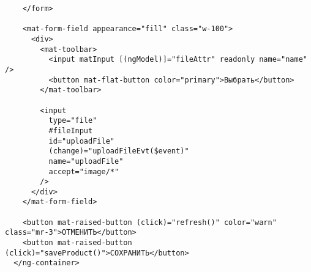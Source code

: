 \begin{lstlisting}
    </form>
    
    <mat-form-field appearance="fill" class="w-100">
      <div>
        <mat-toolbar>
          <input matInput [(ngModel)]="fileAttr" readonly name="name" />
          <button mat-flat-button color="primary">Выбрать</button>
        </mat-toolbar>
    
        <input
          type="file"
          #fileInput
          id="uploadFile"
          (change)="uploadFileEvt($event)"
          name="uploadFile"
          accept="image/*"
        />
      </div>
    </mat-form-field>
    
    <button mat-raised-button (click)="refresh()" color="warn" class="mr-3">ОТМЕНИТЬ</button>
    <button mat-raised-button (click)="saveProduct()">СОХРАНИТЬ</button>
  </ng-container>  
\end{lstlisting}


